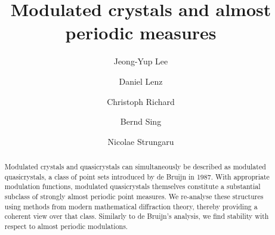 \documentclass[11pt, a4wide]{amsart}
\numberwithin{lemma}{section}
\begin{document}


\title[]{Modulated crystals and almost periodic measures%
}



\author{Jeong-Yup Lee}
\address{Department of Mathematics Education, Catholic Kwandong University, Gangneung, Gangwon 25601, Korea
and KIAS, 85 Hoegiro, Dongdaemun-gu, Seoul, 02455, Korea}


\author{Daniel Lenz}
\address{Fakult\"at f\"ur Mathematik und Informatik, Friedrich Schiller Universit\"at Jena, 07737 Jena, Germany}

\author{Christoph Richard}
\address{Department f\"{u}r Mathematik, Friedrich-Alexander-Universit\"{a}t Erlangen-N\"{u}rnberg, Cauerstrasse 11, 91058 Erlangen, Germany}

\author{Bernd Sing}
\address{Department of Mathematics, University of the West Indies, Cave Hill, P.O.\ Box 64, Bridgetown, BB11000, Barbados} 



\author{Nicolae Strungaru}
\address{Department of Mathematical Sciences, MacEwan University,
10700 “ 104 Avenue, Edmonton, AB, T5J 4S2,
and Institute of Mathematics ``Simon Stoilow'', Bucharest, Romania}

\renewcommand{\thefootnote}{\fnsymbol{footnote}} 
\renewcommand{\thefootnote}{\arabic{footnote}} 



\maketitle



\begin{abstract}
Modulated crystals and quasicrystals can simultaneously be described as modulated quasicrystals, a class of point sets introduced by de Bruijn in 1987. With appropriate modulation functions, modulated quasicrystals themselves constitute a substantial subclass of strongly almost periodic point measures. We re-analyse these structures using methods from modern mathematical diffraction theory, thereby providing a coherent view over that class. Similarly to de Bruijn's analysis, we find stability with respect to almost periodic modulations.
\end{abstract}
\end{document}
